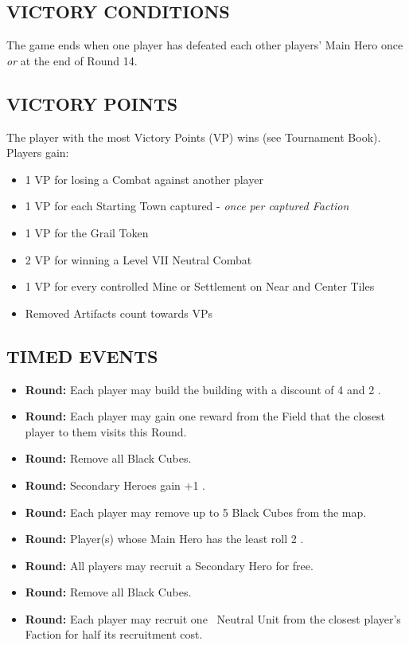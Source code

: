 \begin{multicols*}{2}
\subsection*{\MakeUppercase{Victory Conditions}}
The game ends when one player has defeated each other players' Main Hero once \textit{or} at the end of Round 14.

\subsection*{\MakeUppercase{Victory Points}}
The player with the most Victory Points (VP) wins (see Tournament Book). Players gain:

\begin{itemize}
  \item 1 VP for losing a Combat against another player
  \item 1 VP for each Starting Town captured - \textit{once per captured Faction}
  \item 1 VP for the Grail Token
  \item 2 VP for winning a Level VII Neutral Combat
  \item 1 VP for every controlled Mine or Settlement on Near and Center Tiles
  \item Removed Artifacts count towards VPs
\end{itemize}

\subsection*{\MakeUppercase{Timed Events}}

\begin{itemize}
  \item[\textbf{\nth{1}}] \textbf{Round:} Each player may build the  building with a discount of 4  and 2 .
  \item[\textbf{\nth{2}}] \textbf{Round:} Each player may gain one reward from the Field that the closest player to them visits this Round.
  \item[\textbf{\nth{4}}] \textbf{Round:} Remove all Black Cubes.
  \item[\textbf{\nth{6}}] \textbf{Round:} Secondary Heroes gain +1 .
  \item[\textbf{\nth{8}}] \textbf{Round:} Each player may remove up to 5 Black Cubes from the map.
  \item[\textbf{\nth{9}}] \textbf{Round:} Player(s) whose Main Hero has the least  roll 2 .
  \item[\textbf{\nth{10}}] \textbf{Round:} All players may recruit a Secondary Hero for free.
  \item[\textbf{\nth{11}}] \textbf{Round:} Remove all Black Cubes.
  \item[\textbf{\nth{12}}] \textbf{Round:} Each player may recruit one \silver\ Neutral Unit from the closest player's Faction for half its recruitment cost.
\end{itemize}


\end{multicols*}
